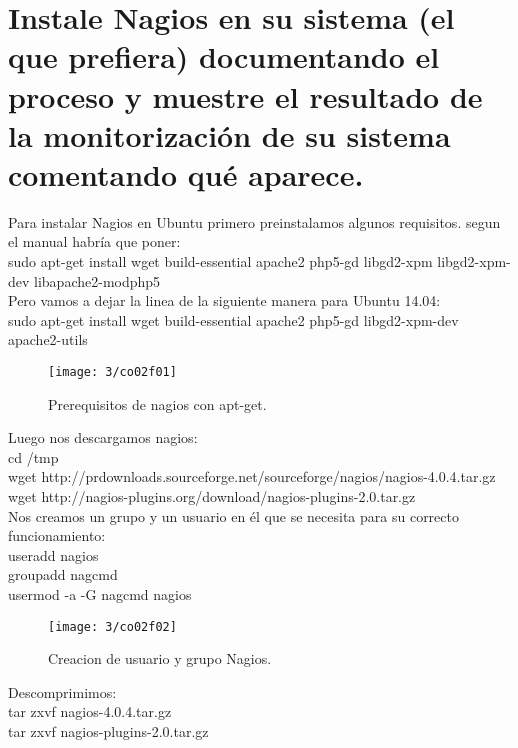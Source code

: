 \section{Instale Nagios en su sistema (el que prefiera)	documentando el proceso y muestre el resultado de la monitorización de su sistema comentando qué aparece. \cite{c08}}


Para instalar Nagios en Ubuntu primero preinstalamos algunos requisitos. segun el manual habría que poner:\\

sudo apt-get install wget build-essential apache2 php5-gd libgd2-xpm libgd2-xpm-dev libapache2-modphp5\\

Pero vamos a dejar la linea de la siguiente manera para Ubuntu 14.04:\\

sudo apt-get install wget build-essential apache2 php5-gd libgd2-xpm-dev apache2-utils\\

\begin{figure}[H]
	\centering
	\texttt{[image: 3/co02f01]}
	\caption{Prerequisitos de nagios con apt-get.}
	\label{fig:f13}
\end{figure}

Luego nos descargamos nagios:\\
cd /tmp\\
wget http://prdownloads.sourceforge.net/sourceforge/nagios/nagios-4.0.4.tar.gz\\
wget http://nagios-plugins.org/download/nagios-plugins-2.0.tar.gz\\

Nos creamos un grupo y un usuario en él que se necesita para su correcto funcionamiento:\\
useradd nagios\\
groupadd nagcmd\\
usermod -a -G nagcmd nagios\\

\begin{figure}[H]
	\centering
	\texttt{[image: 3/co02f02]}
	\caption{Creacion de usuario y grupo Nagios.}
	\label{fig:f14}
\end{figure}

Descomprimimos:\\
tar zxvf nagios-4.0.4.tar.gz\\
tar zxvf nagios-plugins-2.0.tar.gz\\

